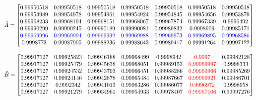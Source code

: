 \begin{equation*}
    \tilde{A} = 
    \begin{bmatrix}
        0.99950518 & 0.99950518 & 0.99950518 & 0.99950518 & 0.99950518
        & 0.99950518 & 0.99950518 \\
        0.99954989 & 0.99954978 & 0.99954961 & 0.99954924 & 0.99954845
        & 0.99954656 & 0.99953879 \\
        0.99968233 & 0.99968194 & 0.99968151 & 0.99968067 & 0.99967874
        & 0.99967339 & 0.9996492  \\
        0.99990299 & 0.99990245 & 0.99990189 & 0.99990081 & 0.99989832
        & 0.9998909 & 0.99985171 \\
        \color{blue}0.99969996 & \color{blue}0.99969994 & \color{blue}0.99969992 
        & \color{blue}0.99969988 & \color{blue}0.99969973 & \color{blue}0.99969895 
        & \color{blue}0.99968586 \\
        0.9998773 &  0.99987995 & 0.99988236 & 0.99988643 & 0.99989417
        & 0.99991264 & 0.99997122 \\
    \end{bmatrix}
\end{equation*}

\begin{equation*}
    \tilde{B} = 
    \begin{bmatrix}
        0.99917127 & 0.99925823 & 0.99946188 & 0.99968499 & 0.9998942
        & \color{red}0.9997 & 0.99982128 \\
        0.99917127 & 0.99925479 & 0.99945638 & 0.99968051 & 0.99989153
        & \color{red}0.99969997 & 0.9998333 \\
        0.99917127 & 0.99924532 & 0.99943793 & 0.99966451 & 0.99988286
        & \color{red}0.99969966 & 0.99985269 \\
        0.99917127 & 0.99924146 & 0.99942878 & 0.99965484 & 0.99987667
        & \color{red}0.99969921 & 0.99986701 \\
        0.99917127 & 0.9992342 &  0.99941013 & 0.99963286 & 0.99986077
        & \color{red}0.9996972 & 0.9998958 \\
        0.99917127 & 0.99921279 & 0.99934961 & 0.99954933 & 0.99978407
        & \color{red}0.99967106 & 0.99997276 \\
    \end{bmatrix}
\end{equation*}
\normalsize


